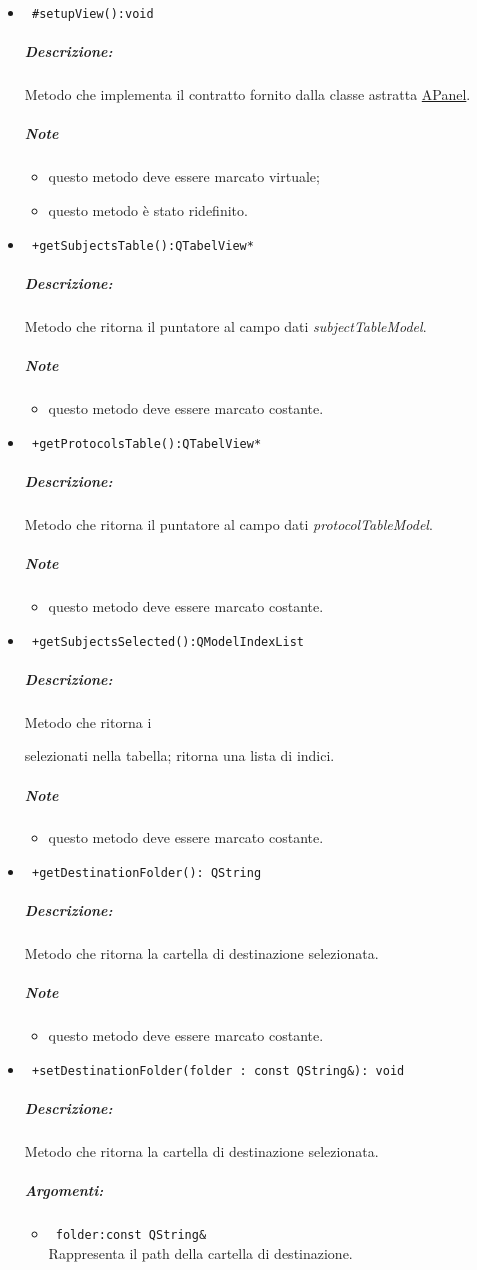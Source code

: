 \begin{itemize}
\item\color{blue}\verb! #setupView():void!
\color{black}
\subparagraph{Descrizione:} Metodo che implementa il contratto fornito dalla classe astratta \hyperref[speAPanel]{APanel}.
 \subparagraph{Note}
 \begin{itemize}
 \item questo metodo deve essere marcato virtuale;
 \item questo metodo è stato ridefinito.
 \end{itemize}

\item\color{blue}\verb! +getSubjectsTable():QTabelView*!
\color{black}
\subparagraph{Descrizione:} Metodo che ritorna il puntatore al campo dati \emph{subjectTableModel}.
 \subparagraph{Note}
 \begin{itemize}
 \item questo metodo deve essere marcato costante.
 \end{itemize}

\item\color{blue}\verb! +getProtocolsTable():QTabelView*!
\color{black}
\subparagraph{Descrizione: }Metodo che ritorna il puntatore al campo dati \emph{protocolTableModel}.
 \subparagraph{Note}
 \begin{itemize}
 \item questo metodo deve essere marcato costante.
 \end{itemize} 
 
\item\color{blue}\verb! +getSubjectsSelected():QModelIndexList!
\color{black}
\subparagraph{Descrizione:} Metodo che ritorna i \subject{} selezionati nella tabella; ritorna una lista di indici.
 \subparagraph{Note}
 \begin{itemize}
 \item questo metodo deve essere marcato costante.
 \end{itemize} 
 
\item\color{blue}\verb! +getDestinationFolder(): QString!
\color{black}
\subparagraph{Descrizione: }Metodo che ritorna la cartella di destinazione selezionata.
 \subparagraph{Note}
 \begin{itemize}
 \item questo metodo deve essere marcato costante.
 \end{itemize} 
 
\item\color{blue}\verb! +setDestinationFolder(folder : const QString&): void!
\color{black}
\subparagraph{Descrizione:} Metodo che ritorna la cartella di destinazione selezionata.
 \subparagraph{Argomenti:}
 \begin{itemize}
 \item \color{RoyalPurple} \verb! folder:const QString& ! \\Rappresenta il path della cartella di destinazione.
 \end{itemize}  
 

\end{itemize}
